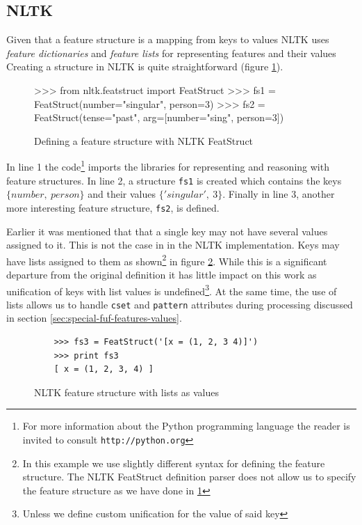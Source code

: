 \documentclass[12pt]{article}
\begin{document}
\subsection{NLTK}
    Given that a feature structure is a mapping from keys to values NLTK uses \textit{feature dictionaries} and 
    \textit{feature lists} for representing features and their values Creating a structure in NLTK is quite straightforward
(figure \ref{fig:nltk-basic-fs}).
\begin{figure}[h!]
    \centering
{\small
\begin{listing}{1}
    >>> from nltk.featstruct import FeatStruct
    >>> fs1 = FeatStruct(number="singular", person=3)
    >>> fs2 = FeatStruct(tense="past", arg=[number="sing", person=3])
\end{listing}
}
\caption{Defining a feature structure with NLTK FeatStruct}
\label{fig:nltk-basic-fs}
\end{figure}

In line 1 the code\footnote{For more information about the Python programming language the reader
is invited to consult {\texttt{\footnotesize http://python.org}}} imports the libraries for representing and reasoning with feature structures.
In line 2, a structure \texttt{fs1} is created which contains the keys $\{number,~person\}$ and their
values $\{'singular',~3\}$. Finally in line 3, another more interesting feature structure, \texttt{fs2}, is defined.

Earlier it was mentioned
that that a single key may not have several values assigned to it. This is not the case in 
in the NLTK implementation. Keys may have lists assigned to them as shown\footnote{In this example we use slightly different syntax for defining the 
feature structure. The NLTK FeatStruct definition parser does not allow us to specify the feature structure
as we have done in \ref{fig:nltk-basic-fs}} in figure \ref{fs-lists}.
While this is a significant departure
from the original definition it has little impact on this work as unification of keys with list 
values is undefined\footnote{Unless we define custom unification for the value of said key}. At the same time, the use of lists allows us to handle \texttt{cset} and \texttt{pattern} attributes
during processing discussed in section \ref{sec:special-fuf-features-values}.

\begin{figure}[h!]
    \centering
{\small
\begin{verbatim}
    >>> fs3 = FeatStruct('[x = (1, 2, 3 4)]')
    >>> print fs3
    [ x = (1, 2, 3, 4) ]
\end{verbatim}
}
\caption{NLTK feature structure with lists as values}
\label{fs-lists}
\end{figure}
\end{document}
